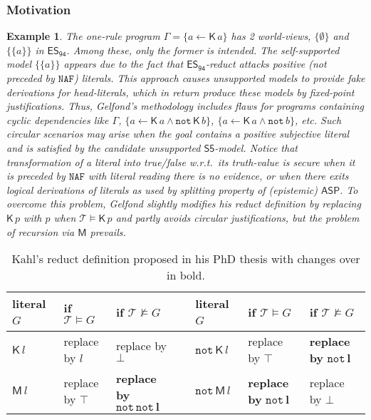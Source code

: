 \documentclass[submission,copyright,creativecommons]{eptcs}
\newcommand{\set}[1]  { \{ #1 \} }
\newcommand{\logic}[1]  { \ensuremath{\mathsf{#1}} }
\newcommand{\sfive}  { \logic{S5} }
\newcommand{\ASP}  { \logic{ASP} }
\newcommand{\naf}  { \texttt{NAF} }
\newcommand{\lpnot}  { \mathtt{not} \, }
\newcommand{\K}  { \mathsf{K} }
\newcommand{\M}  { \mathsf{M} }
\newcommand{\ESdoksandort}  { \logic{ES_{\scriptscriptstyle{94}} } }
\newtheorem{example}{Example}
\begin{document}
\subsubsection{Motivation}
\label{sec:EpisASP}
\begin{example}
\label{ex: motovating ex 1 for EASP} \normalfont
The one-rule program $\Gamma = \set{a \leftarrow \K\,a}$ has 2 world-views,
$\set{\emptyset}$ and $\set{\set a}$ in $\ESdoksandort$. Among these, 
only the former is intended. The self-supported model $\set{\set a}$
appears due to the fact that $\ESdoksandort$-reduct attacks positive 
(not preceded by $\naf$) literals. This approach causes unsupported models to provide
fake derivations for head-literals, which in return produce these models by fixed-point
justifications. Thus, Gelfond's methodology includes flaws 
for programs containing cyclic dependencies like $\Gamma$,
$\set{a \leftarrow \K \,a \land \lpnot \K \, b}$, 
$\set{a \leftarrow \K \,a \land \lpnot b}$, etc. 
Such circular scenarios may arise 
when the goal contains a positive subjective literal and 
is satisfied by the candidate unsupported $\sfive$-model. Notice that 
transformation of a literal into true/false w.r.t.\ its truth-value is secure
when it is preceded by $\naf$ with literal reading \emph{there is no evidence}, 
or when there exits logical derivations of literals as used by splitting property 
of (epistemic) $\ASP$. To overcome this problem, Gelfond \cite{gelfond2011new}
slightly modifies his reduct definition by replacing $\K\,p$ with $p$ 
when $\mathcal T \models \K\, p$
and partly avoids circular justifications,
but the problem of recursion via $\M$ prevails.
\end{example}
%
\begin{table}
\centering
\small{
\caption{Kahl's reduct definition proposed in his PhD thesis \cite{kahl2014refining} 
with changes over \cite{gelfond2011new} in bold.} 
\label{table:Kahl.reduct}
\begin{tabular}{l l l l l l l}
\hline
            literal $G$ 	~~
        & if  $\mathcal T \models G$ 
        & if  $\mathcal T \not\models G$ &&
                    literal $G$ 	~~
        & if  $\mathcal T \models G$  
        & if  $\mathcal T \not\models G$
\\ \hline
$\K\,l$ 		&  replace by $l$	   & replace by $\bot$  &&
$\lpnot \K\,l$ 			& replace by $\top$		& \textbf{replace by} $\boldsymbol{\lpnot l}$	
\\ \hline
$\M\,l$ 			& replace by $\top$	   &  \textbf{replace by} $\boldsymbol{\lpnot \lpnot l}$ &&
$\lpnot \M\,l$ 	&  \textbf{replace by} $\boldsymbol{\lpnot l}$  & replace by $\bot$
\\ \hline
\end{tabular} }
\end{table}
\end{document}
